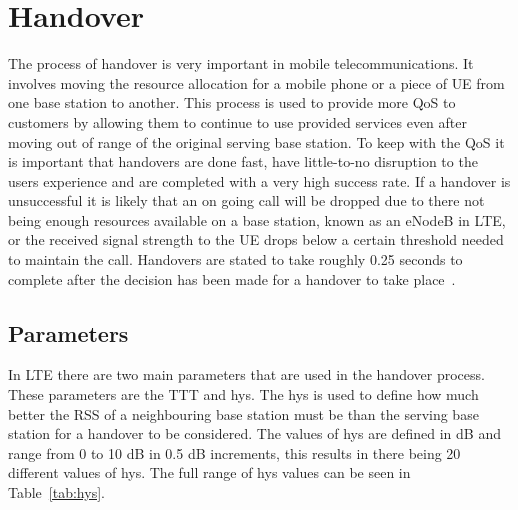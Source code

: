 \section{Handover}\label{handover}
The process of handover is very important in mobile telecommunications. It involves moving the resource allocation for a mobile phone or a piece of \ac{UE} from one base station to another. This process is used to provide more \ac{QoS} to customers by allowing them to continue to use provided services even after moving out of range of the original serving base station. To keep with the QoS it is important that handovers are done fast, have little-to-no disruption to the users experience and are completed with a very high success rate. If a handover is unsuccessful it is likely that an on going call will be dropped due to there not being enough resources available on a base station, known as an \ac{eNodeB} in \ac{LTE}, or the received signal strength to the \ac{UE} drops below a certain threshold needed to maintain the call. Handovers are stated to take roughly 0.25 seconds to complete after the decision has been made for a handover to take place~\cite{jansen2010handover}.

\subsection{Parameters}\label{parameters}
In LTE there are two main parameters that are used in the handover process. These parameters are the \ac{TTT} and \ac{hys}. The hys is used to define how much better the \ac{RSS} of a neighbouring base station must be than the serving base station for a handover to be considered. The values of hys are defined in \ac{dB} and range from 0 to 10 dB in 0.5 dB increments, this results in there being 20 different values of hys. The full range of hys values can be seen in Table~\ref{tab:hys}.

